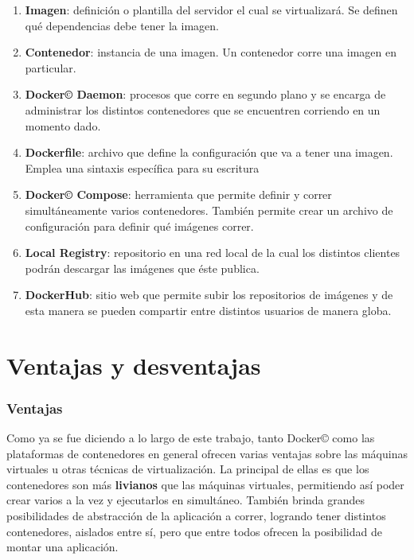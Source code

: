 \documentclass[14pt]{extarticle}
\newcommand{\docker}{Docker\copyright}
\begin{document}
        \begin{enumerate}
            \item \textbf{Imagen}: definición o plantilla del servidor el cual se virtualizará. Se definen qué dependencias debe tener la imagen.
            \item \textbf{Contenedor}: instancia de una imagen. Un contenedor corre una imagen en particular.
            \item \textbf{\docker{} Daemon}: procesos que corre en segundo plano y se encarga de administrar los distintos contenedores que se encuentren corriendo en un momento dado.
            \item \textbf{Dockerfile}: archivo que define la configuración que va a tener una imagen. Emplea una sintaxis específica para su escritura
            \item \textbf{\docker{} Compose}: herramienta que permite definir y correr simultáneamente varios contenedores. También permite crear un archivo de configuración para definir qué imágenes correr.
            \item \textbf{Local Registry}: repositorio en una red local de la cual los distintos clientes podrán descargar las imágenes que éste publica.
            \item \textbf{DockerHub}: sitio web que permite subir los repositorios de imágenes y de esta manera se pueden compartir entre distintos usuarios de manera globa.
        \end{enumerate}
        

    \clearpage
    \section{Ventajas y desventajas}
        \subsubsection*{Ventajas}
        Como ya se fue diciendo a lo largo de este trabajo, tanto \docker{} como las plataformas de contenedores en general ofrecen varias ventajas sobre las máquinas virtuales u otras técnicas de virtualización. La principal de ellas es que los contenedores son más \textbf{livianos} que las máquinas virtuales, permitiendo así poder crear varios a la vez y ejecutarlos en simultáneo. También brinda grandes posibilidades de abstracción de la aplicación a correr, logrando tener distintos contenedores, aislados entre sí, pero que entre todos ofrecen la posibilidad de montar una aplicación.
\end{document}
